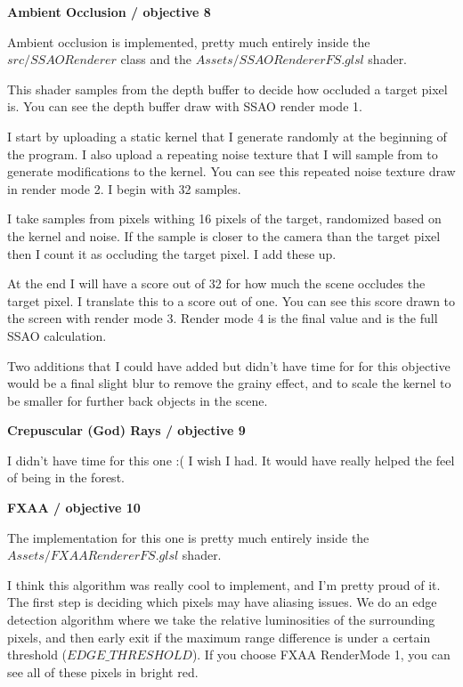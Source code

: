 \documentclass[10pt]{article}
\begin{document}
	\begin{center}
		\bf Ambient Occlusion / objective 8
	\end{center}
	
	Ambient occlusion is implemented, pretty much entirely inside the $src/SSAORenderer$ class and the $Assets/SSAORendererFS.glsl$ shader.
	
	This shader samples from the depth buffer to decide how occluded a target pixel is. You can see the depth buffer draw with SSAO render mode 1.
	
	I start by uploading a static kernel that I generate randomly at the beginning of the program. I also upload a repeating noise texture that I will sample from to generate modifications to the kernel. You can see this repeated noise texture draw in render mode 2. I begin with 32 samples.
	
	I take samples from pixels withing 16 pixels of the target, randomized based on the kernel and noise. If the sample is closer to the camera than the target pixel then I count it as occluding the target pixel. I add these up.
	
	At the end I will have a score out of 32 for how much the scene occludes the target pixel. I translate this to a score out of one. You can see this score drawn to the screen with render mode 3. Render mode 4 is the final value and is the full SSAO calculation.
	
	Two additions that I could have added but didn't have time for for this objective would be a final slight blur to remove the grainy effect, and to scale the kernel to be smaller for further back objects in the scene.
	
	\begin{center}
		\bf Crepuscular (God) Rays / objective 9
	\end{center}
	
	I didn't have time for this one :( I wish I had. It would have really helped the feel of being in the forest. 
	
	\begin{center}
		\bf FXAA / objective 10
	\end{center}
	
	The implementation for this one is pretty much entirely inside the $Assets/FXAARendererFS.glsl$ shader.
	
	I think this algorithm was really cool to implement, and I'm pretty proud of it. The first step is deciding which pixels may have aliasing issues. We do an edge detection algorithm where we take the relative luminosities of the surrounding pixels, and then early exit if the maximum range difference is under a certain threshold ($EDGE\_THRESHOLD$). If you choose FXAA RenderMode 1, you can see all of these pixels in bright red.
	
\end{document}
